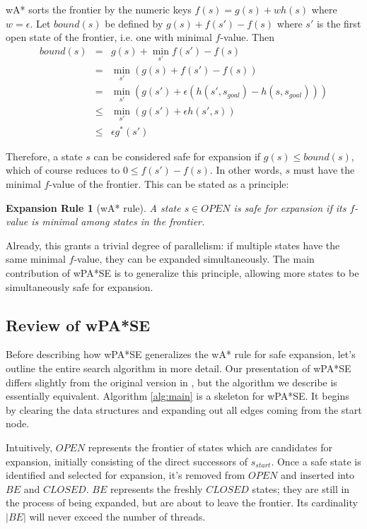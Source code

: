 \documentclass[letterpaper]{article}
\newtheorem{rul}{Expansion Rule}
\begin{document}
wA* sorts the frontier by the numeric keys $f(s) = g(s) + wh(s)$ where $w = \epsilon$. Let $bound(s)$ be defined by $g(s) + f(s') - f(s)$ where $s'$ is the first open state of the frontier, i.e. one with minimal $f$-value. Then
\begin{eqnarray*}
bound(s) &=& g(s) + \min_{s'}f(s') - f(s)
\\&=& \min_{s'}(g(s) + f(s') - f(s))
\\&=& \min_{s'}(g(s') + \epsilon(h(s',s_{goal}) - h(s,s_{goal}))) 
\\&\le& \min_{s'}(g(s') + \epsilon h(s',s))
\\&\le& \epsilon g^*(s')
\end{eqnarray*}

Therefore, a state $s$ can be considered safe for expansion if $g(s) \le bound(s)$, which of course reduces to $0 \le f(s') - f(s)$. In other words, $s$ must have the minimal $f$-value of the frontier. This can be stated as a principle:

\begin{rul}[wA* rule]
A state $s\in OPEN$ is safe for expansion if its $f$-value is minimal among states in the frontier.
\end{rul}

Already, this grants a trivial degree of parallelism: if multiple states have the same minimal $f$-value, they can be expanded simultaneously. The main contribution of wPA*SE is to generalize this principle, allowing more states to be simultaneously safe for expansion.

\subsection{Review of wPA*SE}

Before describing how wPA*SE generalizes the wA* rule for safe expansion, let's outline the entire search algorithm in more detail. Our presentation of wPA*SE differs slightly from the original version in \cite{asdf}, but the algorithm we describe is essentially equivalent. Algorithm \ref{alg:main} is a skeleton for wPA*SE. It begins by clearing the data structures and expanding out all edges coming from the start node.

Intuitively, $OPEN$ represents the frontier of states which are candidates for expansion, initially consisting of the direct successors of $s_{start}$. Once a safe state is identified and selected for expansion, it's removed from $OPEN$ and inserted into $BE$ and $CLOSED$. $BE$ represents the freshly $CLOSED$ states; they are still in the process of being expanded, but are about to leave the frontier. Its cardinality $|BE|$ will never exceed the number of threads.
\end{document}
